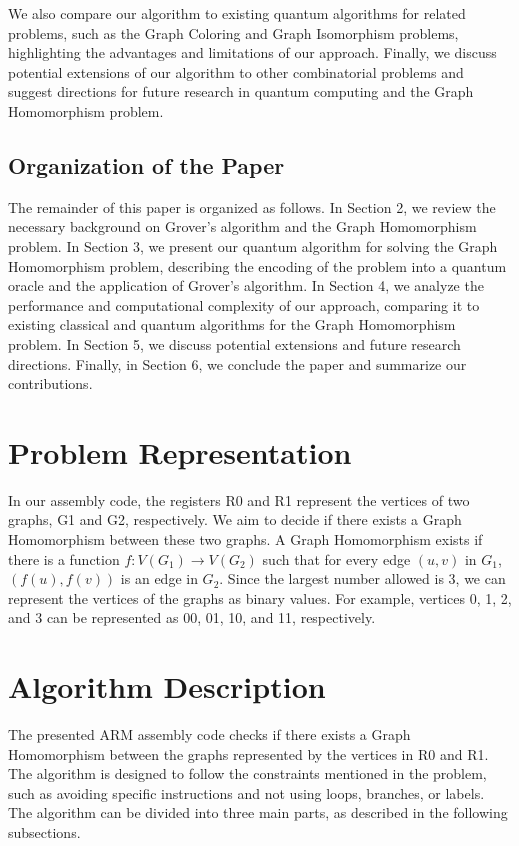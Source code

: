 We also compare our algorithm to existing quantum algorithms for related problems, such as the Graph Coloring and Graph Isomorphism problems, highlighting the advantages and limitations of our approach. Finally, we discuss potential extensions of our algorithm to other combinatorial problems and suggest directions for future research in quantum computing and the Graph Homomorphism problem.

\subsection{Organization of the Paper}

The remainder of this paper is organized as follows. In Section 2, we review the necessary background on Grover's algorithm and the Graph Homomorphism problem. In Section 3, we present our quantum algorithm for solving the Graph Homomorphism problem, describing the encoding of the problem into a quantum oracle and the application of Grover's algorithm. In Section 4, we analyze the performance and computational complexity of our approach, comparing it to existing classical and quantum algorithms for the Graph Homomorphism problem. In Section 5, we discuss potential extensions and future research directions. Finally, in Section 6, we conclude the paper and summarize our contributions.

\section{Problem Representation}

In our assembly code, the registers R0 and R1 represent the vertices of two graphs, G1 and G2, respectively. We aim to decide if there exists a Graph Homomorphism between these two graphs. A Graph Homomorphism exists if there is a function $f: V(G_1) \rightarrow V(G_2)$ such that for every edge $(u, v)$ in $G_1$, $(f(u), f(v))$ is an edge in $G_2$. Since the largest number allowed is 3, we can represent the vertices of the graphs as binary values. For example, vertices 0, 1, 2, and 3 can be represented as 00, 01, 10, and 11, respectively. 

\section{Algorithm Description}

The presented ARM assembly code checks if there exists a Graph Homomorphism between the graphs represented by the vertices in R0 and R1. The algorithm is designed to follow the constraints mentioned in the problem, such as avoiding specific instructions and not using loops, branches, or labels. The algorithm can be divided into three main parts, as described in the following subsections.

